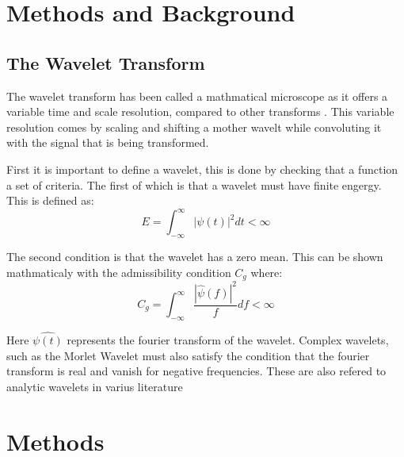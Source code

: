 \documentclass{article}
\begin{document}
\section{Methods and Background}

\subsection{The Wavelet Transform}

The wavelet transform has been called a mathmatical microscope as it offers a variable time and scale resolution, compared to other transforms \cite{Addison:2002} .
This variable resolution comes by scaling and shifting a mother wavelt while convoluting it with the signal that is being transformed. 

First it is important to define a wavelet, this is done by checking that a function a set of criteria. 
The first of which is that a wavelet must have finite engergy. 
This is defined as: 
\begin{equation}\label{eq:example}
    E = \int_{-\infty}^{\infty} |\psi(t)|^2dt < \infty
\end{equation} 

The second condition is that the wavelet has a zero mean. 
This can be shown mathmaticaly with the admissibility condition $C_g$ where: 
\begin{equation}
    C_g = \int_{-\infty}^{\infty} \frac{|\hat{\psi}(f)|^2}{f} df < \infty
\end{equation}

Here $\hat{\psi(t)}$ represents the fourier transform of the wavelet. 
Complex wavelets, such as the Morlet Wavelet must also satisfy the condition that the fourier transform is real and vanish for negative frequencies.
These are also refered to analytic wavelets in varius literature

\section{Methods}


\end{document}
